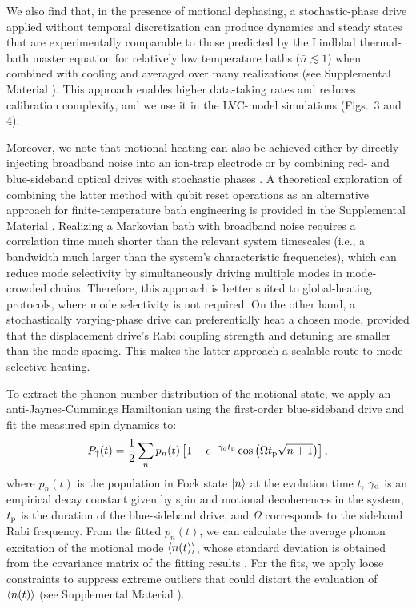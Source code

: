 \documentclass[%
reprint,
superscriptaddress,
amsmath,amssymb,
aps,
prl,
floatfix,
]{revtex4-2}
\begin{document}
We also find that, in the presence of motional dephasing, a stochastic-phase drive applied without temporal discretization can produce dynamics and steady states that are experimentally comparable to those predicted by the Lindblad thermal-bath master equation for relatively low temperature baths ($\bar{n}\lesssim 1$) when combined with cooling and averaged over many realizations (see Supplemental Material \cite{so2025fT_supp}). This approach enables higher data-taking rates and reduces calibration complexity, and we use it in the LVC-model simulations (Figs.~3 and 4).

Moreover, we note that motional heating can also be achieved either by directly injecting broadband noise into an ion-trap electrode \cite{myatt2000decoherence,navickas2025chemical} or by combining red- and blue-sideband optical drives with stochastic phases \cite{sun2025quantum,olaya-agudelo2025open}. A theoretical exploration of combining the latter method with qubit reset operations as an alternative approach for finite-temperature bath engineering is provided in the Supplemental Material \cite{so2025fT_supp}. Realizing a Markovian bath with broadband noise requires a correlation time much shorter than the relevant system timescales (i.e., a bandwidth much larger than the system’s characteristic frequencies), which can reduce mode selectivity by simultaneously driving multiple modes in mode-crowded chains. Therefore, this approach is better suited to global-heating protocols, where mode selectivity is not required. On the other hand, a stochastically varying-phase drive can preferentially heat a chosen mode, provided that the displacement drive’s Rabi coupling strength and detuning are smaller than the mode spacing. This makes the latter approach a scalable route to mode-selective heating.

To extract the phonon-number distribution of the motional state, we apply an anti-Jaynes-Cummings Hamiltonian using the first-order blue-sideband drive and fit the measured spin dynamics to:
\begin{equation}
    P_{\uparrow} (t)=\frac{1}{2}\sum_n p_n(t)\left[1-e^{-\gamma_{\rm d} t_{\rm p}}\cos{\left(\Omega t_{\rm p}\sqrt{n+1}\right)}\right],
    \label{eq_phonmeasure}
\end{equation}
where $p_n(t)$ is the population in Fock state $\ket{n}$ at the evolution time $t$, $\gamma_{\rm d}$ is an empirical decay constant given by spin and motional decoherences in the system, $t_{\rm p}$ is the duration of the blue-sideband drive, and $\Omega$ corresponds to the sideband Rabi frequency. From the fitted $p_n(t)$, we can calculate the average phonon excitation of the motional mode $\braket{n(t)}$, whose standard deviation is obtained from the covariance matrix of the fitting results \cite{cai2021rabi}. For the fits, we apply loose constraints to suppress extreme outliers that could distort the evaluation of $\braket{n(t)}$ (see Supplemental Material \cite{so2025fT_supp}).
\end{document}
